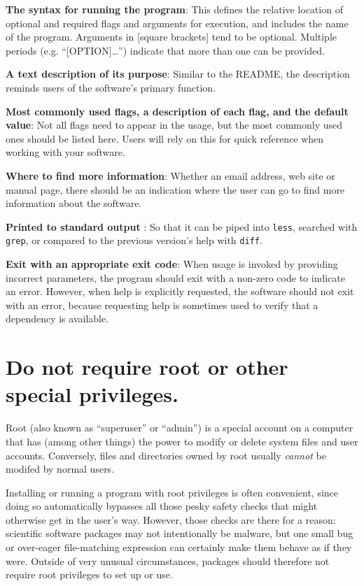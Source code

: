 \documentclass[10pt]{article}
\begin{document}
\textbf{The syntax for running the program}: This defines the relative
location of optional and required flags and arguments for execution, and
includes the name of the program. Arguments in {[}square brackets{]}
tend to be optional. Multiple periods (e.g. ``{[}OPTION{]}\ldots{}'')
indicate that more than one can be provided.

\textbf{A text description of its purpose}: Similar to the README, the
description reminds users of the software's primary function.

\textbf{Most commonly used flags, a description of each flag, and the
default value}: Not all flags need to appear in the usage, but the most
commonly used ones should be listed here. Users will rely on this for
quick reference when working with your software.

\textbf{Where to find more information}: Whether an email address, web
site or manual page, there should be an indication where the user can go
to find more information about the software.

\textbf{Printed to standard output} : So that it can be piped into
\texttt{less}, searched with \texttt{grep}, or compared to the previous
version's help with \texttt{diff}.

\textbf{Exit with an appropriate exit code}: When usage is invoked by
providing incorrect parameters, the program should exit with a non-zero
code to indicate an error. However, when help is explicitly requested,
the software should not exit with an error, because requesting help is
sometimes used to verify that a dependency is available.

\section{Do not require root or other special privileges.}

Root (also known as ``superuser'' or ``admin'') is a special account on
a computer that has (among other things) the power to modify or delete
system files and user accounts. Conversely, files and directories owned
by root usually \emph{cannot} be modifed by normal users.

Installing or running a program with root privileges is often
convenient, since doing so automatically bypasses all those pesky safety
checks that might otherwise get in the user's way. However, those checks
are there for a reason: scientific software packages may not
intentionally be malware, but one small bug or over-eager file-matching
expression can certainly make them behave as if they were. Outside of
very unusual circumstances, packages should therefore not require root
privileges to set up or use.
\end{document}
